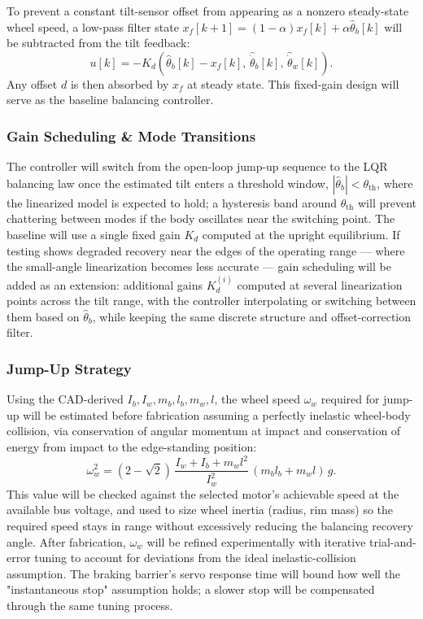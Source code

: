 To prevent a constant tilt-sensor offset from appearing as a nonzero steady-state wheel speed, a low-pass filter state $x_f[k+1] = (1-\alpha)x_f[k] + \alpha\hat\theta_b[k]$ will be subtracted from the tilt feedback:
\begin{equation}
u[k] = -K_d(\hat\theta_b[k]-x_f[k],\, \hat{\dot\theta}_b[k],\, \hat{\dot\theta}_w[k]).
\end{equation}
Any offset $d$ is then absorbed by $x_f$ at steady state. This fixed-gain design will serve as the baseline balancing controller.
\subsubsection{Gain Scheduling \& Mode Transitions}

The controller will switch from the open-loop jump-up sequence to the LQR balancing law once the estimated tilt enters a threshold window, $|\hat\theta_b|<\theta_{\text{th}}$, where the linearized model is expected to hold; a hysteresis band around $\theta_{\text{th}}$ will prevent chattering between modes if the body oscillates near the switching point. The baseline will use a single fixed gain $K_d$ computed at the upright equilibrium. If testing shows degraded recovery near the edges of the operating range — where the small-angle linearization becomes less accurate — gain scheduling will be added as an extension: additional gains $K_d^{(i)}$ computed at several linearization points across the tilt range, with the controller interpolating or switching between them based on $\hat\theta_b$, while keeping the same discrete structure and offset-correction filter.

\subsubsection{Jump-Up Strategy}

Using the CAD-derived $I_b, I_w, m_b, l_b, m_w, l$, the wheel speed $\omega_w$ required for jump-up will be estimated before fabrication assuming a perfectly inelastic wheel-body collision, via conservation of angular momentum at impact and conservation of energy from impact to the edge-standing position:
\begin{equation}
\omega_w^2 = (2-\sqrt2)\,\frac{I_w+I_b+m_wl^2}{I_w^2}\,(m_bl_b+m_wl)\,g.
\end{equation}
This value will be checked against the selected motor's achievable speed at the available bus voltage, and used to size wheel inertia (radius, rim mass) so the required speed stays in range without excessively reducing the balancing recovery angle. After fabrication, $\omega_w$ will be refined experimentally with iterative trial-and-error tuning to account for deviations from the ideal inelastic-collision assumption. The braking barrier's servo response time will bound how well the "instantaneous stop" assumption holds; a slower stop will be compensated through the same tuning process.

